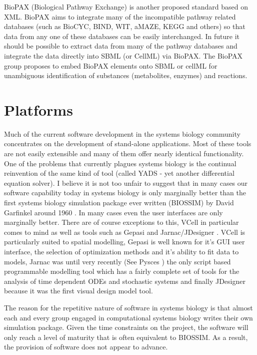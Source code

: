 \documentclass[12pt]{article}
\begin{document}
{BioPAX (Biological Pathway Exchange) is another proposed standard
based on XML. BioPAX aims to integrate many of the incompatible
pathway related databases (such as BioCYC, BIND, WIT, aMAZE, KEGG
and others) so that data from any one of these databases can be easily
interchanged. In future it should be possible to extract data from
many of the pathway databases and integrate the data directly into
SBML (or CellML) via BioPAX. The BioPAX group proposes to embed BioPAX 
elements onto SBML or cellML for unambiguous identification of 
substances (metabolites, enzymes) and reactions.


\section{Platforms}

Much of the current software development in the systems biology
community concentrates on the development of stand-alone
applications. Most of these tools are not easily extensible and
many of them offer nearly identical functionality. One of the
problems that currently plagues systems biology is the continual
reinvention of the same kind of tool (called YADS - yet another
differential equation solver). I believe it is not too unfair to
suggest that in many cases our software capability today in
systems biology is only marginally better than the first systems
biology simulation package ever written (BIOSSIM) by David
Garfinkel around 1960 \cite{Ga68}. In many cases even the user
interfaces are only marginally better. There are of course
exceptions to this, VCell \cite{VCELL} in particular comes to mind as
well as tools such as Gepasi \cite{Gepasi:1993} and Jarnac/JDesigner \cite{Sauro:Omics}.
VCell is particularly suited to spatial modelling, Gepasi is well known for it's
GUI user interface, the selection of optimization methods and it's ability to fit data to models, Jarnac was until very recently (See Pysces \cite{Pysces2005}) the only script based programmable modelling tool which has a fairly complete set of tools for the analysis of time dependent ODEs and stochastic systems and finally JDesigner because it was the first visual design model tool.

The reason for the repetitive nature of software in systems biology is that almost each and every group engaged in computational systems biology writes their own simulation package. Given the time constraints on the project, the software will only reach a level
of maturity that is often equivalent to BIOSSIM. As a result, the
provision of software does not appear to advance.

}
\end{document}
